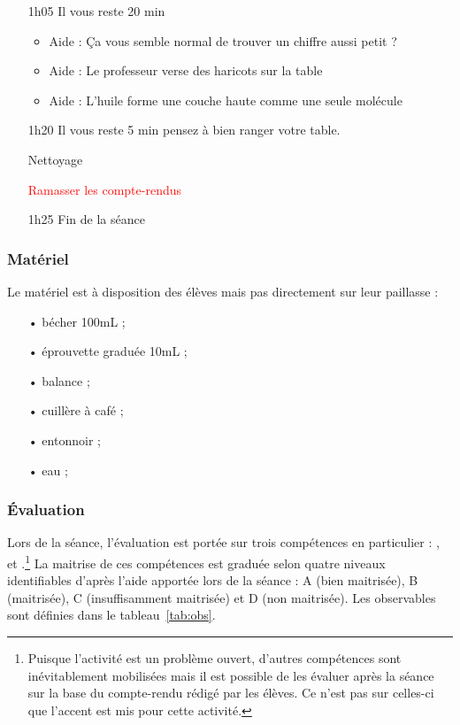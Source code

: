 \documentclass[12pt,a4paper]{article}
\begin{document}
\begin{itemize}
\item[1h05]
\og Il vous reste 20 min \fg{}

\begin{itemize}
\item Aide : Ça vous semble normal de trouver un chiffre aussi petit ?
\item Aide : Le professeur verse des haricots sur la table
\item Aide : L'huile forme une couche haute comme une seule molécule
\end{itemize}

\item[1h20]
\og Il vous reste 5 min pensez à bien ranger votre table. \fg{} 

Nettoyage

\textcolor{red}{Ramasser les compte-rendus}
 
\item[1h25] Fin de la séance
\end{itemize}

\subsubsection{Matériel}

Le matériel est à disposition des élèves mais pas directement sur leur paillasse :
\begin{itemize}
\item[•] bécher \unit{100}{mL} ;
\item[•] éprouvette graduée \unit{10}{mL} ;
\item[•] balance ;
\item[•] cuillère à café ;
\item[•] entonnoir ;
\item[•] eau ;
\end{itemize}

\subsubsection{Évaluation}

Lors de la séance, l'évaluation est portée sur trois compétences en particulier : \anarai{}, \rea{} et \val{}.\footnote{Puisque l'activité est un problème ouvert, d'autres compétences sont inévitablement mobilisées mais il est possible de les évaluer après la séance sur la base du compte-rendu rédigé par les élèves.
Ce n'est pas sur celles-ci que l'accent est mis pour cette activité.}
La maitrise de ces compétences est graduée selon quatre niveaux identifiables d'après l'aide apportée lors de la séance : A (bien maitrisée), B (maitrisée), C (insuffisamment maitrisée) et D (non maitrisée).
Les observables sont définies dans le tableau~\ref{tab:obs}.
\end{document}

